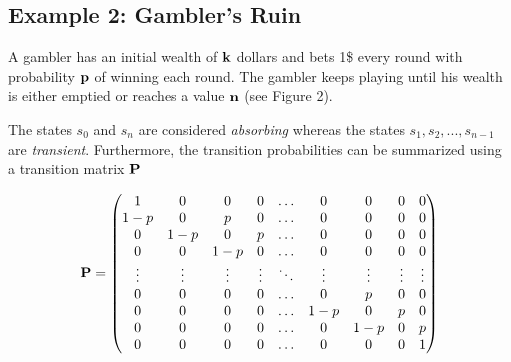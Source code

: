 \documentclass[a4paper,12pt]{article}
\theoremstyle{definition}
\let\oldtextbf\mathbf
\renewcommand{\mathbf}[1]{\oldtextbf{\boldmath #1}}
\begin{document}
	\begin{tcolorbox}
	\subsection*{Example 2: Gambler's Ruin}
    	A gambler has an initial wealth of $\mathbf{k}$ dollars and bets 1\$ every round with probability $\mathbf{p}$ of winning each 				round.
    	The gambler keeps playing until his wealth is either emptied or reaches a value $\mathbf{n}$ (see Figure 2).   
	\end{tcolorbox}	    
        
	The states $s_0$ and $s_n$ are considered \emph{absorbing} whereas the states $s_1, s_2, ..., s_{n-1}$ are \emph{transient}. 
	Furthermore, the transition probabilities can be summarized using a transition matrix $\mathbf{P}$ 
	
	\begin{equation}
		\begin{aligned}
        \mathbf{P} =
           \begin{pmatrix}
                1 & 0 & 0   & 0   & \ldots & 0 & 0 & 0& 0\\
                1-p & 0   & p & 0   & \ldots & 0 & 0 & 0& 0\\
                0 & 1-p   & 0   & p & \ldots & 0 & 0 & 0& 0\\
                0 & 0   & 1-p   & 0   & \ldots & 0 & 0 & 0& 0\\
           \vdots & \vdots & \vdots & \vdots & \ddots & \vdots & \vdots & \vdots& \vdots\\
                0 & 0   & 0   & 0   &\ldots &0 &p & 0 & 0\\
                0 & 0   & 0   & 0   &\ldots &1-p &0 & p & 0\\
                0 & 0   & 0   & 0   &\ldots &0 &1-p & 0 & p\\
                0 & 0   & 0   & 0   &\ldots &0 &0 & 0 & 1
            \end{pmatrix}
		\end{aligned}
	\end{equation}
\end{document}
